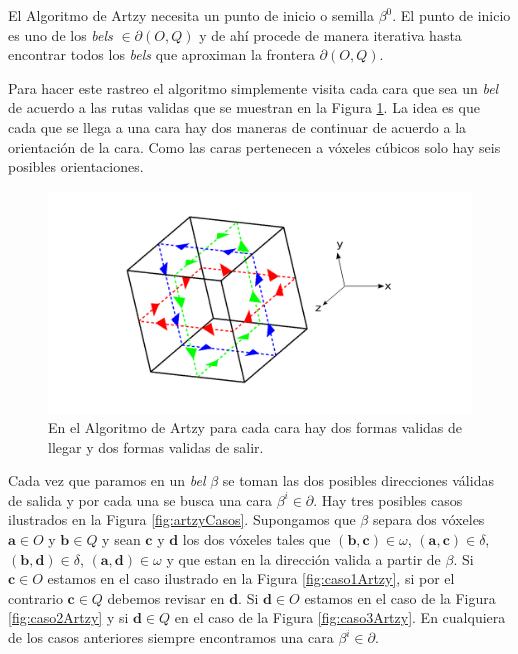 El Algoritmo de Artzy necesita un punto de inicio o semilla $\beta^0$. El punto de inicio es uno de los \emph{bels} $\in \partial (O, Q)$ y de ahí procede de manera iterativa hasta encontrar todos los \emph{bels} que aproximan la frontera $\partial(O, Q)$.

Para hacer este rastreo el algoritmo simplemente visita cada cara que sea un \emph{bel} de acuerdo a las rutas validas que se muestran en la Figura \ref{fig:artzyOrientacion}. La idea es que cada que se llega a una cara hay dos maneras de continuar de acuerdo a la orientación de la cara. Como las caras pertenecen a vóxeles cúbicos solo hay seis posibles orientaciones.

\begin{figure}[htp]
 \centering
  \includegraphics[scale=0.45]{img/cap01/artzyTrayectorias}
  \caption[Rutas validas en el Algoritmo de Artzy en la rejilla \textit{sc}]{En el Algoritmo de Artzy para cada cara hay dos formas validas de llegar y dos formas validas de salir.}
  \label{fig:artzyOrientacion}
\end{figure}

Cada vez que paramos en un \emph{bel} $\beta$ se toman las dos posibles direcciones válidas de salida y por cada una se busca una cara $\beta^i \in \partial$. Hay tres posibles casos ilustrados en la Figura \ref{fig:artzyCasos}. Supongamos que $\beta$ separa dos vóxeles $\textbf{a} \in O$ y $\textbf{b} \in Q$ y sean $\textbf{c}$ y $\textbf{d}$ los dos vóxeles tales que $(\textbf{b}, \textbf{c}) \in \omega$, $(\textbf{a}, \textbf{c}) \in \delta$, $(\textbf{b}, \textbf{d}) \in \delta$, $(\textbf{a}, \textbf{d}) \in \omega$ y que estan en la dirección valida a partir de $\beta$. Si $\textbf{c} \in O$ estamos en el caso ilustrado en la Figura \ref{fig:caso1Artzy}, si por el contrario $\textbf{c} \in Q$ debemos revisar en $\textbf{d}$. Si $\textbf{d} \in O$ estamos en el caso de la Figura \ref{fig:caso2Artzy} y si $\textbf{d} \in Q$ en el caso de la Figura \ref{fig:caso3Artzy}. En cualquiera de los casos anteriores siempre encontramos una cara $\beta^i \in \partial$.

